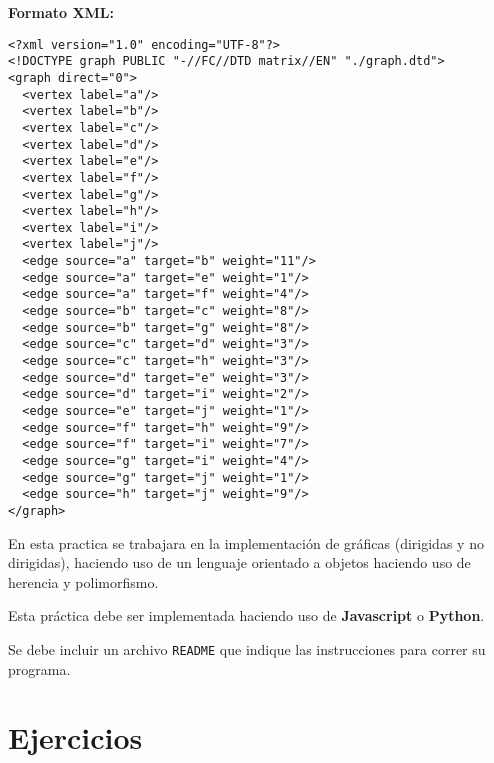 \documentclass{article}
\begin{document}
\textbf{Formato XML:}
\begin{verbatim}
<?xml version="1.0" encoding="UTF-8"?>
<!DOCTYPE graph PUBLIC "-//FC//DTD matrix//EN" "./graph.dtd">
<graph direct="0">
  <vertex label="a"/>
  <vertex label="b"/>	
  <vertex label="c"/>
  <vertex label="d"/>
  <vertex label="e"/>
  <vertex label="f"/>
  <vertex label="g"/>
  <vertex label="h"/>
  <vertex label="i"/>
  <vertex label="j"/>
  <edge source="a" target="b" weight="11"/>
  <edge source="a" target="e" weight="1"/>
  <edge source="a" target="f" weight="4"/>
  <edge source="b" target="c" weight="8"/>
  <edge source="b" target="g" weight="8"/>
  <edge source="c" target="d" weight="3"/>
  <edge source="c" target="h" weight="3"/>
  <edge source="d" target="e" weight="3"/>
  <edge source="d" target="i" weight="2"/>
  <edge source="e" target="j" weight="1"/>
  <edge source="f" target="h" weight="9"/>
  <edge source="f" target="i" weight="7"/>
  <edge source="g" target="i" weight="4"/>
  <edge source="g" target="j" weight="1"/>
  <edge source="h" target="j" weight="9"/>
</graph>
\end{verbatim}

En esta practica se trabajara en la implementación de gráficas (dirigidas y no dirigidas), haciendo uso de un lenguaje orientado a objetos haciendo uso de herencia y polimorfismo.

Esta práctica debe ser implementada haciendo uso de \textbf{Javascript} o \textbf{Python}.

Se debe incluir un archivo \texttt{README} que indique las instrucciones para correr su programa.

\section{Ejercicios}
\end{document}
